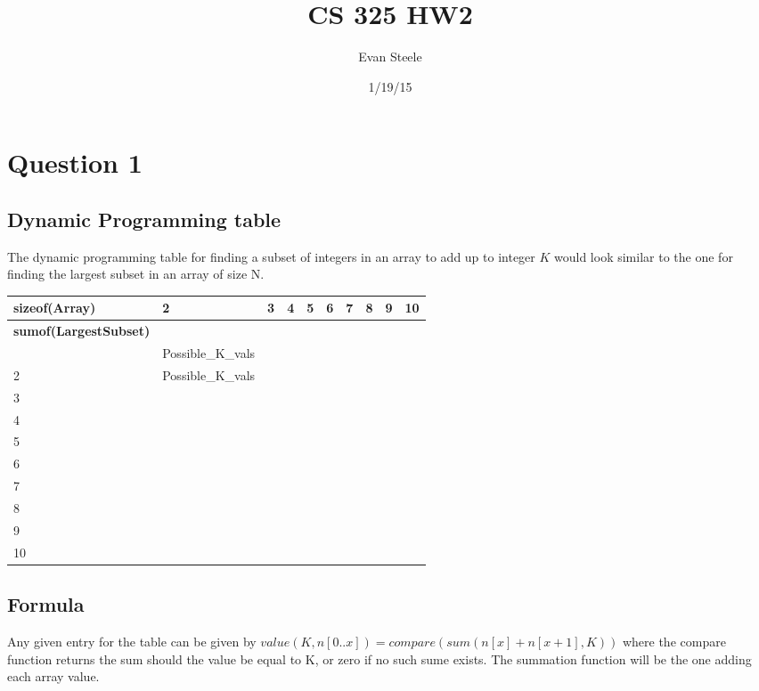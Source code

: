 \documentclass{article}
\title{CS 325 HW2}
\date{1/19/15}
\author{Evan Steele}
\begin{document}
\lstset{language=bash}
\maketitle
{}
\newpage
{}

\section{Question 1}
\subsection{Dynamic Programming table}
The dynamic programming table for finding a subset of integers in an array to add up to integer $K$ would look similar to the one for finding the largest subset in an array of size N. 
\begin{table}[h]
\begin{tabular}{llllllllll}
\textbf{sizeof(Array)} & 2 & 3 & 4 & 5 & 6 & 7 & 8 & 9 & 10 \\ \hline
\multicolumn{1}{l|}{\textbf{sumof(LargestSubset)}} &  &  &  &  &  &  &  &  &  \\
\multicolumn{1}{l|}{\textbf{}} & Possible\_K\_vals &  &  &  &  &  &  &  &  \\
\multicolumn{1}{l|}{2} & Possible\_K\_vals &  &  &  &  &  &  &  &  \\
\multicolumn{1}{l|}{3} &  &  &  &  &  &  &  &  &  \\
\multicolumn{1}{l|}{4} &  &  &  &  &  &  &  &  &  \\
\multicolumn{1}{l|}{5} &  &  &  &  &  &  &  &  &  \\
\multicolumn{1}{l|}{6} &  &  &  &  &  &  &  &  &  \\
\multicolumn{1}{l|}{7} &  &  &  &  &  &  &  &  &  \\
\multicolumn{1}{l|}{8} &  &  &  &  &  &  &  &  &  \\
\multicolumn{1}{l|}{9} &  &  &  &  &  &  &  &  &  \\
\multicolumn{1}{l|}{10} &  &  &  &  &  &  &  &  & 
\end{tabular}
\end{table}
\subsection{Formula}
Any given entry for the table can be given by $value(K,n[0..x]) = compare(sum(n[x]+n[x+1],K))$ where the compare function returns the sum should the value be equal to K, or zero if no such sume exists. The summation function will be the one adding each array value.
\end{document}

